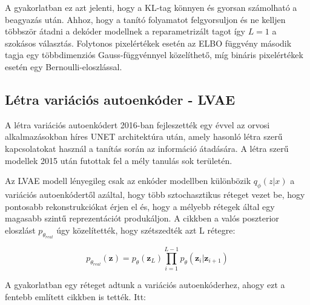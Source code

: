 \documentclass[12pt, english]{article}
\begin{document}
\vspace{4mm}

\par A gyakorlatban ez azt jelenti, hogy a KL-tag könnyen és gyorsan számolható a beagyazás után. Ahhoz, hogy a tanító folyamatot felgyorsuljon és ne kelljen többször átadni a dekóder modellnek a reparametrizált tagot így $L = 1$ a szokásos választás. Folytonos pixelértékek esetén az ELBO függvény második tagja egy többdimenziós Gauss-függvénnyel közelíthető, míg bináris pixelértékek esetén egy Bernoulli-eloszlással.

\vspace{5mm}

\subsection{Létra variációs autoenkóder - LVAE}

\vspace{5mm}

\par A létra variációs autoenkódert 2016-ban fejleszették \cite{sonderby2016ladder} egy évvel az orvosi alkalmazásokban híres UNET \cite{ronneberger2015u} architektúra után, amely hasonló létra szerű kapcsolatokat használ a tanítás során az információ átadására. A létra szerű modellek 2015 után futottak fel a mély tanulás sok területén.

\vspace{4mm}

\par Az LVAE modell lényegileg csak az enkóder modellben különbözik $q_{\phi} (z | x)$ a variációs autoenkódertől azáltal, hogy több sztochasztikus réteget vezet be, hogy pontosabb rekonstrukciókat érjen el és, hogy a mélyebb rétegek által egy magasabb szintű reprezentációt produkáljon. A \cite{sonderby2016ladder} cikkben a valós poszterior eloszlást $p_{\theta_{real}}$  úgy közelítették, hogy szétszedték azt L rétegre:

\vspace{4mm}

\begin{equation}
    p_{\theta_{real}}(\bm{z}) =  p_{\theta}(\bm{z}_{L})\prod_{i = 1}^{L - 1}p_{\theta}(\bm{z}_i | \bm{z}_{i+1})
\end{equation}

\vspace{4mm}

\par A gyakorlatban egy réteget adtunk a variációs autoenkóderhez, ahogy ezt a fentebb említett cikkben is tették. Itt:
\end{document}
